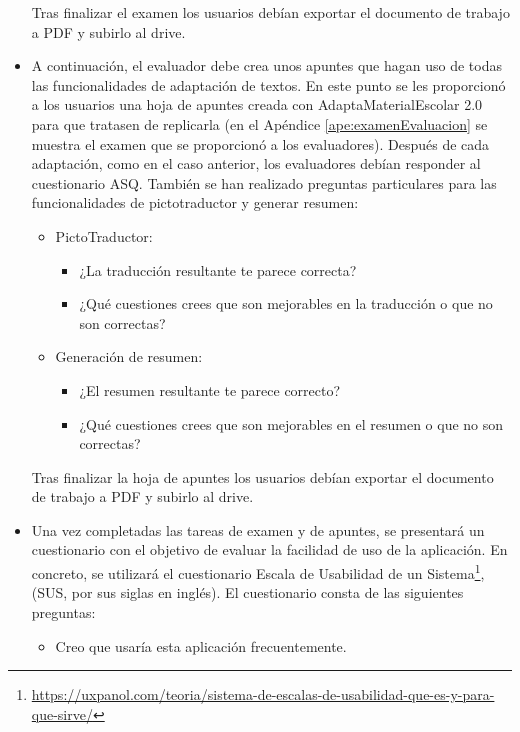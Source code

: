 \begin{itemize}
          Tras finalizar el examen los usuarios debían exportar el documento de trabajo a PDF y subirlo al drive.

    \item A continuación, el evaluador debe crea unos apuntes que hagan uso de todas las funcionalidades de adaptación de textos. En este punto se les proporcionó a los usuarios una hoja de apuntes creada con AdaptaMaterialEscolar 2.0 para que tratasen de replicarla (en el Apéndice \ref{ape:examenEvaluacion} se muestra el examen que se proporcionó a los evaluadores). Después de cada adaptación, como en el caso anterior, los evaluadores debían responder al cuestionario ASQ. También se han realizado preguntas particulares para las funcionalidades de pictotraductor y generar resumen:
          \begin{itemize}
              \item PictoTraductor: 
              \begin{itemize}
                \item ¿La traducción resultante te parece correcta? 
                \item ¿Qué cuestiones crees que son mejorables en la traducción o que no son correctas?
              \end{itemize}
              \item Generación de resumen: 
              \begin{itemize}
                \item ¿El resumen resultante te parece correcto?
                \item ¿Qué cuestiones crees que son mejorables en el resumen o que no son correctas?
              \end{itemize}
          \end{itemize}
          Tras finalizar la hoja de apuntes los usuarios debían exportar el documento de trabajo a PDF y subirlo al drive.
    \item Una vez completadas las tareas de examen y de apuntes, se presentará un cuestionario con el objetivo de evaluar la facilidad de uso de la aplicación. En concreto, se utilizará el cuestionario Escala de Usabilidad de un Sistema\footnote{\url{https://uxpanol.com/teoria/sistema-de-escalas-de-usabilidad-que-es-y-para-que-sirve/}}, (SUS, por sus siglas en inglés). El cuestionario consta de las siguientes preguntas:
          \begin{itemize}
              \item Creo que usaría esta aplicación frecuentemente.

\end{itemize}
\end{itemize}
